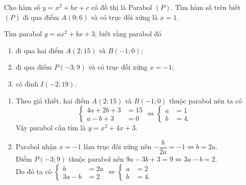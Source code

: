 \begin{bt}%
	Cho hàm số $y=x^2+bx+c$ có đồ thị là Parabol $(P)$. Tìm hàm số trên biết $(P)$ đi qua điểm $A(0;6)$ và có trục đối xứng là $x=1$.
\end{bt}

\begin{bt}%
	Tìm parabol $y=a x^2+b x+3$, biết rằng parabol đó
	\begin{enumerate}
		\item đi qua hai điểm $A(2; 15)$ và $B(-1; 0)$;
		\item đi qua điểm $P(-3; 9)$ và có trục đối xứng $x=-1$;
		\item có đỉnh $I(-2; 19)$.
	\end{enumerate}
	\loigiai
	{
		\begin{enumerate}
			\item Theo giả thiết, hai điểm $A(2; 15)$ và $B(-1; 0)$ thuộc parabol nên ta có
			\[\left\{\begin{aligned} 4 a+2 b+3&=1 5 \\ a-b+3&=0 \end{aligned} \Leftrightarrow \left\{\begin{aligned} a&=1 \\b&=4.\end{aligned}\right.\right.\]
			Vậy parabol cần tìm là $y=x^2+4 x+3$.
			\item Parabol nhận $x=-1$ làm trục đối xứng nên $-\dfrac{b}{2 a}=-1 \Leftrightarrow b=2 a$.\\
			Điểm $P(-3; 9)$ thuộc parabol nên $9 a-3 b+3=9 \Leftrightarrow 3 a-b=2$.\\
			Do đó ta có $\left\{\begin{aligned} b&=2 a \\ 3 a-b&=2\end{aligned} \Leftrightarrow \left\{\begin{aligned}a&=2 \\ b&=4.\end{aligned}\right.\right.$\\

\end{enumerate}}
\end{bt}
